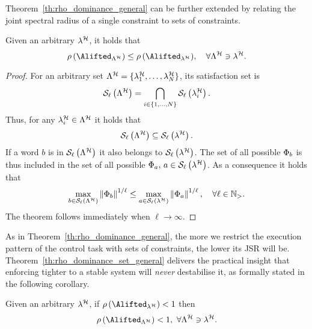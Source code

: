 Theorem~\ref{th:rho_dominance_general} can be further extended by relating the joint spectral radius of a single constraint to sets of constraints.
\begin{theorem}%
    \label{th:rho_dominance_set_general}%
    Given an arbitrary \ewhc{} $\lambda^{\mathcal{H}}$, it holds that
    $$
        \rho\,(\Alifted_{\Lambda^\strat}) \leq \rho \,( \Alifted_{\lambda^\strat} ) ,\quad \forall \Lambda^\strat \ni \lambda^\strat.
    $$
    \begin{proof}
        For an arbitrary \ewhc{} set $\Lambda^{\mathcal{H}} = \{\lambda^{\mathcal{H}}_1, \dots, \lambda^{\mathcal{H}}_N\}$, its satisfaction set is
        $$
            \mathcal{S}_{\ell}\left( \Lambda^{\mathcal{H}} \right) = \bigcap_{i \in \{1,\dots, N\}} \mathcal{S}_{\ell}\left( \lambda^{\mathcal{H}}_i \right).
        $$
        Thus, for any $\lambda^{\mathcal{H}}_i \in \Lambda^{\mathcal{H}}$ it holds that 
        $$
            \mathcal{S}_{\ell}\left(  \Lambda^{\mathcal{H}}  \right) \subseteq \mathcal{S}_{\ell}\left( \lambda^{\mathcal{H}} \right).
        $$
        If a word $b$ is in $\mathcal{S}_{\ell}\left( \Lambda^{\mathcal{H}} \right)$ it also belongs to $\mathcal{S}_{\ell}\left( \lambda^{\mathcal{H}} \right)$. 
        The set of all possible $\Phi_{b}$ is thus included in the set of all possible $\Phi_{a},\, a \in \mathcal{S}_{\ell}\left( \lambda^{\mathcal{H}} \right)$.
        As a consequence it holds that
        \begin{equation*}
            \max_{b \in \mathcal{S}_{\ell}\left( \Lambda^{\mathcal{H}} \right)} \left\lVert\Phi_{b}\right\rVert^{1/\ell} \leq
            \max_{a \in \mathcal{S}_{\ell}\left( \lambda^{\mathcal{H}} \right)} \left\lVert\Phi_{a}\right\rVert^{1/\ell}, \quad
            \forall \ell \in \mathbb{N}_{>}.
        \end{equation*}
        The theorem follows immediately when $\ell\rightarrow \infty$.
    \end{proof}
\end{theorem}

As in Theorem~\ref{th:rho_dominance_general}, the more we restrict the execution pattern of the control task with sets of constraints, the lower its JSR will be.
%
Theorem~\ref{th:rho_dominance_set_general} delivers the practical insight that enforcing tighter \ewhc{} to a stable system will \emph{never} destabilise it, as formally stated in the following corollary.
\begin{corollary}%
    \label{cor:rho_dominance_set}%
    Given an arbitrary \ewhc{} $\lambda^{\mathcal{H}}$, if $\rho \,( \Alifted_{\lambda^\strat} ) < 1$ then
    $$
        \rho\,(\Alifted_{\Lambda^\strat}) < 1 ,\,\, \forall \Lambda^\strat \ni \lambda^\strat.
    $$
\end{corollary}
